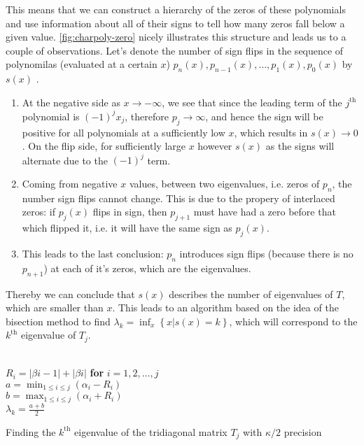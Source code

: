 \documentclass{article}
\begin{document}
 This means that we can construct a hierarchy of the zeros of these polynomials and use information about all of their signs to tell how many zeros fall below a given value. \autoref{fig:charpoly-zero} nicely illustrates this structure and leads us to a couple of observations. Let's denote the number of sign flips in the sequence of polynomilas (evaluated at a certain $x$) $p_n(x), p_{n-1}(x), \dots, p_1(x), p_0(x)$ by $s(x)$ . 
 \begin{enumerate}
 	\item At the negative side as $x \to -\infty$, we see that since the leading term of the $j^{\mathrm{th}}$ polynomial is $\left(-1\right)^j x_j$, therefore $p_j \to \infty$, and hence the sign will be positive for all polynomials at a sufficiently low $x$, which results in $s(x)\to0$. On the flip side, for sufficiently large $x$ however $s(x)$ as the signs will alternate due to the $\left(-1\right)^j$ term.
 	\item Coming from negative $x$ values, between two eigenvalues, i.e. zeros of $p_n$, the number sign flips cannot change. This is due to the propery of interlaced zeros: if $p_j(x)$ flips in sign, then $p_{j+1}$ must have had a zero before that which flipped it, i.e. it will have the same sign as $p_j(x)$.
 	\item This leads to the last conclusion: $p_n$ introduces sign flips (because there is no $p_{n+1}$) at each of it's zeros, which are the eigenvalues.
 \end{enumerate}
 
 Thereby we can conclude that $s(x)$ describes the number of eigenvalues of $T$, which are smaller than $x$. This leads to an algorithm based on the idea of the bisection method to find $\lambda_k = \inf_{x} \left\lbrace x | s(x)=k\right\rbrace$, which will correspond to the $k^{\mathrm{th}}$ eigenvalue of $T_j$.
 
 \begin{algorithm2e}[ht]
 	
 	\SetAlgoLined
 	\\
 	$R_i = \left|\beta{i-1}\right|+\left|\beta{i}\right|$ \textbf{for} $i=1,2,\dots,j$\\
 	$a = \min_{1\leq i \leq j}{\left(\alpha_{i}-R_i\right)}$\\
 	$b = \max_{1\leq i \leq j}{\left(\alpha_{i}+R_i\right)}$\\
 	$\lambda_k = \frac{a+b}{2}$
 	\caption{Finding the $k^{\mathrm{th}}$ eigenvalue of the tridiagonal matrix $T_j$ with $\kappa/2$ precision}\label{alg:eigfind-Tj}
 \end{algorithm2e}
 
\end{document}
